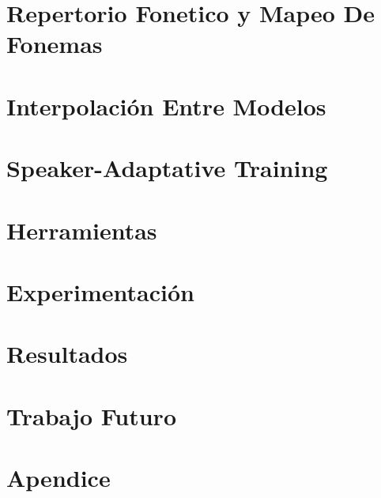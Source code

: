 \documentclass[11pt,a4paper,twoside]{tesis}
\begin{document}

\def\autor{Franco Negri}
\def\tituloTesis{Implementación y evaluación de un sistema de sintesis de habla con acento extranjero variable}
\def\runtitle{Implementacíón y evaluación de un sistema de sintesis de habla}
\def\director{Agustin Gravano}
\def\codirector{Master Yoda}
\def\lugar{Buenos Aires, 2018}


\frontmatter

\pagestyle{empty}
%
\cleardoublepage
\cleardoublepage

\cleardoublepage
\tableofcontents

\mainmatter
\pagestyle{headings}

%


\section{Repertorio Fonetico y Mapeo De Fonemas}


\section{Interpolación Entre Modelos}


\section{Speaker-Adaptative Training}


\section{Herramientas}

\pagebreak
\section{Experimentación}

\pagebreak
\section{Resultados}

\pagebreak

\section{Trabajo Futuro}

\pagebreak
\section{Apendice}


\backmatter
%
\end{document}
